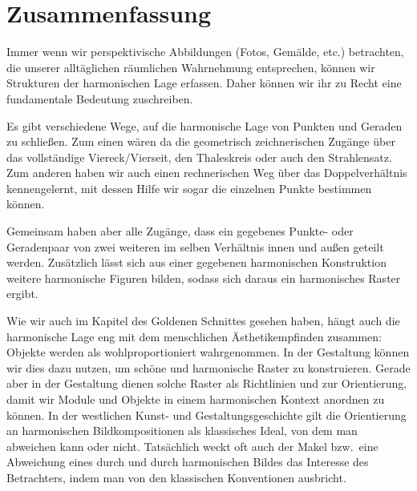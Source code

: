 \documentclass[12pt,a4paper]{article}
\begin{document}
\newpage
\section{Zusammenfassung}

Immer wenn wir perspektivische Abbildungen (Fotos, Gemälde, etc.) betrachten, die unserer alltäglichen räumlichen Wahrnehmung entsprechen, können wir Strukturen der harmonischen Lage erfassen. Daher können wir ihr zu Recht eine fundamentale Bedeutung zuschreiben.

Es gibt verschiedene Wege, auf die harmonische Lage von Punkten und Geraden zu schließen. Zum einen wären da die geometrisch zeichnerischen Zugänge über das vollständige Viereck/Vierseit, den Thaleskreis oder auch den Strahlensatz. Zum anderen haben wir auch einen rechnerischen Weg über das Doppelverhältnis kennengelernt, mit dessen Hilfe wir sogar die einzelnen Punkte bestimmen können.

Gemeinsam haben aber alle Zugänge, dass ein gegebenes Punkte- oder Geradenpaar von  zwei weiteren im selben Verhältnis innen und außen geteilt werden. Zusätzlich lässt sich aus einer gegebenen harmonischen Konstruktion weitere harmonische Figuren bilden, sodass sich daraus ein harmonisches Raster ergibt.

Wie wir auch im Kapitel des Goldenen Schnittes gesehen haben, hängt auch die harmonische Lage eng mit dem menschlichen Ästhetikempfinden zusammen: Objekte werden als wohlproportioniert wahrgenommen. In der Gestaltung können wir dies dazu nutzen, um schöne und harmonische Raster zu konstruieren. Gerade aber in der Gestaltung dienen solche Raster als Richtlinien und zur Orientierung, damit wir Module und Objekte in einem harmonischen Kontext anordnen zu können. In der westlichen Kunst- und Gestaltungsgeschichte gilt die Orientierung an harmonischen Bildkompositionen als klassisches Ideal, von dem man abweichen kann oder nicht. Tatsächlich weckt oft auch der Makel bzw.~eine Abweichung eines durch und durch harmonischen Bildes das Interesse des Betrachters, indem man von den klassischen Konventionen ausbricht.

\newpage
{}
\listoffigures

\newpage
\nocite{proCG}
\nocite{perspectivesOnProGeo}
\nocite{doppelVerhaeltnis}
\nocite{proGeoGrundlagen}


\end{document}
